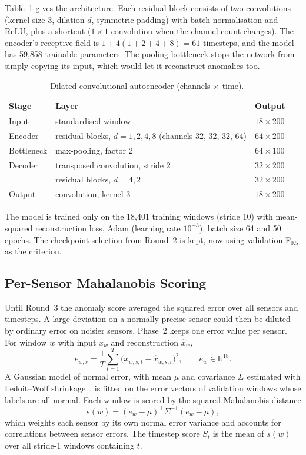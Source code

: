 \documentclass[runningheads]{llncs}
\begin{document}
Table~\ref{tab:arch} gives the architecture. Each residual block consists of two convolutions (kernel size 3, dilation $d$, symmetric padding) with batch normalisation and ReLU, plus a shortcut ($1\times1$ convolution when the channel count changes). The encoder's receptive field is $1 + 4(1+2+4+8) = 61$ timesteps, and the model has 59{,}858 trainable parameters. The pooling bottleneck stops the network from simply copying its input, which would let it reconstruct anomalies too.

\begin{table}[ht]
\centering
\caption{Dilated convolutional autoencoder (channels $\times$ time).}\label{tab:arch}
\begin{tabular}{lll}
\toprule
Stage & Layer & Output \\
\midrule
Input & standardised window & $18 \times 200$ \\
Encoder & residual blocks, $d = 1, 2, 4, 8$ (channels 32, 32, 32, 64) & $64 \times 200$ \\
Bottleneck & max-pooling, factor 2 & $64 \times 100$ \\
Decoder & transposed convolution, stride 2 & $32 \times 200$ \\
 & residual blocks, $d = 4, 2$ & $32 \times 200$ \\
Output & convolution, kernel 3 & $18 \times 200$ \\
\bottomrule
\end{tabular}
\end{table}

The model is trained only on the 18{,}401 training windows (stride 10) with mean-squared reconstruction loss, Adam (learning rate $10^{-3}$), batch size 64 and 50 epochs. The checkpoint selection from Round~2 is kept, now using validation F$_{0.5}$ as the criterion.

\subsection{Per-Sensor Mahalanobis Scoring}

Until Round~3 the anomaly score averaged the squared error over all sensors and timesteps. A large deviation on a normally precise sensor could then be diluted by ordinary error on noisier sensors. Phase~2 keeps one error value per sensor. For window $w$ with input $x_w$ and reconstruction $\hat{x}_w$,
\begin{equation}
  e_{w,s} = \frac{1}{T}\sum_{t=1}^{T}\bigl(x_{w,s,t} - \hat{x}_{w,s,t}\bigr)^2, \qquad e_w \in \mathbb{R}^{18}.
\end{equation}
A Gaussian model of normal error, with mean $\mu$ and covariance $\Sigma$ estimated with Ledoit--Wolf shrinkage~\cite{ledoit2004well}, is fitted on the error vectors of validation windows whose labels are all normal. Each window is scored by the squared Mahalanobis distance
\begin{equation}
  s(w) = (e_w - \mu)^\top \Sigma^{-1} (e_w - \mu),
\end{equation}
which weights each sensor by its own normal error variance and accounts for correlations between sensor errors. The timestep score $S_t$ is the mean of $s(w)$ over all stride-1 windows containing $t$.
\end{document}
